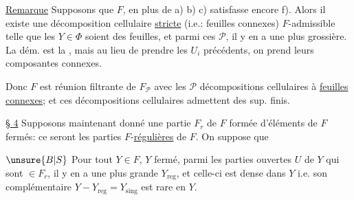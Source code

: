 \uline{Remarque} Supposons que $F$, en plus de a) b) c)  satisfasse encore f). Alors il existe une décomposition cellulaire \uline{stricte}  (i.e.: feuilles connexes) $F$-admissible telle que les $Y\in\Phi$ soient des  feuilles, et \unsure{$=$|---} parmi ces $\mathcal P$, il y en a une plus grossière. La dém. est la , mais au lieu de prendre les $U_i$ précédents, on prend leurs composantes connexes.

Donc $F$ est réunion filtrante de $F_{\mathcal P}$ avec les $\mathcal P$ décompositions cellulaires à \uline{feuilles connexes}; et ces décompositions cellulaires admettent des sup. finis.

\uline{§ 4} 
Supposons maintenant donné une partie $F_r$ de $F$  formée d'éléments de $F$  fermés: ce seront les parties $F$-\uline{régulières} de $F$. On suppose que

\textcircled{$\unsure{B|S}$} Pour tout $Y\in F$, $Y$  fermé, parmi les parties  ouvertes $U$ de $Y$ qui sont $\in F_r$, il y en a une plus grande $Y_{\mathrm{reg}}$, et  celle-ci est dense dans $Y$ i.e. son complémentaire $Y-Y_{\mathrm{reg}}=Y_{\mathrm{sing}}$ est rare en $Y$.

